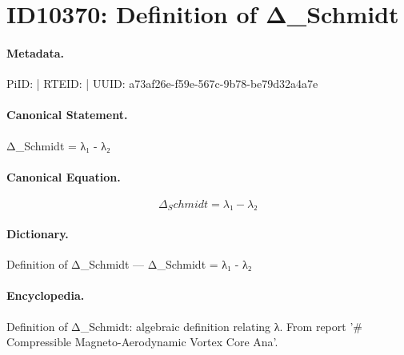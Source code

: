 \section*{ID10370: Definition of Δ\_Schmidt}
\paragraph{Metadata.}
PiID:  | RTEID:  | UUID: a73af26e-f59e-567c-9b78-be79d32a4a7e

\paragraph{Canonical Statement.}
Δ\_Schmidt = λ₁ - λ₂

\paragraph{Canonical Equation.}
\[
Δ_Schmidt = λ₁ - λ₂
\]

\paragraph{Dictionary.}
Definition of Δ\_Schmidt — Δ\_Schmidt = λ₁ - λ₂

\paragraph{Encyclopedia.}
Definition of Δ\_Schmidt: algebraic definition relating λ. From report '\# Compressible Magneto-Aerodynamic Vortex Core Ana'.
